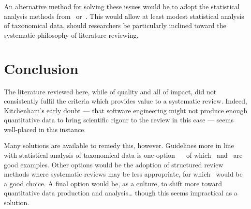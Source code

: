 An alternative method for solving these issues would be to adopt the statistical analysis methods from~\cite{Kitchenham2013} or~\cite{Chen2007}. This would allow at least modest statistical analysis of taxonomical data, should researchers be particularly inclined toward the systematic philosophy of literature reviewing.\par

\section{Conclusion}

The literature reviewed here, while of quality and all of impact, did not consistently fulfil the criteria which provides value to a systematic review. Indeed, Kitchenham's early doubt --- that software engineering might not produce enough quantitative data to bring scientific rigour to the review in this case --- seems well-placed in this instance.\par

Many solutions are available to remedy this, however. Guidelines more in line with statistical analysis of taxonomical data is one option --- of which~\cite{Kitchenham2013} and~\cite{Kampanes2007} are good examples. Other options would be the adoption of structured review methods where systematic reviews may be less appropriate, for which~\cite{Webster2002} would be a good choice. A final option would be, as a culture, to shift more toward quantitative data production and analysis\dots{} though this seems impractical as a solution.\par







